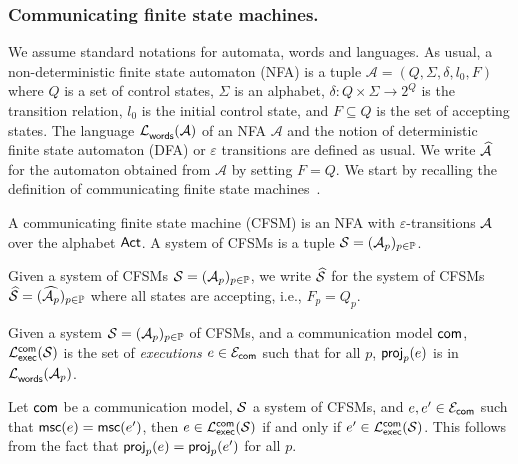   
  




\subsubsection*{Communicating finite state machines.}
We assume standard notations for automata, words and languages. As usual, a non-deterministic finite state automaton (NFA) is a tuple
$\mathcal A = (Q,\Sigma, \delta, l_0, F)$ where $Q$ is a set of control states, 
$\Sigma$ is an alphabet, $\delta:Q\times\Sigma\to 2^Q$ 
is the transition relation,
$l_0$ is the initial control state, and $F\subseteq Q$ is the set of accepting states.
The language $\languageofnfa{\mathcal A}$ of an NFA $\mathcal A$ and the notion of deterministic
finite state automaton (DFA) or $\varepsilon$ transitions are defined as usual.
We write $\acceptcompletion{\mathcal A}{}$ for the automaton obtained from $\mathcal A$ by setting
$F=Q$. We start  by recalling the definition of communicating finite state machines~\cite{BrandZafiropulo}.

\begin{definition}[CFSM] 
    A communicating finite state machine (CFSM) is an NFA with $\varepsilon$-transitions $\acfsm$ over the alphabet $\Act$.
    A system of CFSMs is a tuple $\cfsms = (\acfsm_p)_{p\in\Procs}$.
\end{definition}

 Given a system of CFSMs $\cfsms=(\acfsm_p)_{p\in\Procs}$,
we write $\acceptcompletion{\cfsms}{}$ for the system of CFSMs $\acceptcompletion{\cfsms}=(\acceptcompletion{\acfsm_p})_{p\in\Procs}$
where all states are accepting, i.e., $F_p = Q_p$.

\begin{definition}\label{def:executions-of-cfsms}
Given a system 
$\cfsms = (\acfsm_p)_{p\in\Procs}$ of CFSMs, and a communication model $\acommunicationmodel$,
 $\executionsofcfsms{\cfsms}{\acommunicationmodel}$ is the set  of \emph{executions} $e\in\executionsofmodel{\acommunicationmodel}$
such that for all $p$, $\projofon{e}{p}$ is in $\languageofnfa{\acfsm_p}{}$.
\end{definition}

\begin{remark}
	Let $\acommunicationmodel$ be a communication model, 
	$\cfsms$  a system of CFSMs, and $e,e'\in\executionsofmodel{\acommunicationmodel}$ such that $\mscof{e}=\mscof{e'}$, 
	then $e\in\executionsof{\cfsms}{\acommunicationmodel}$ 
	if and only if $e'\in\executionsof{\cfsms}{\acommunicationmodel}$. This follows from the fact that $\projofon{e}{p}= \projofon{e'}{p}$ for all $p$.
\end{remark}

